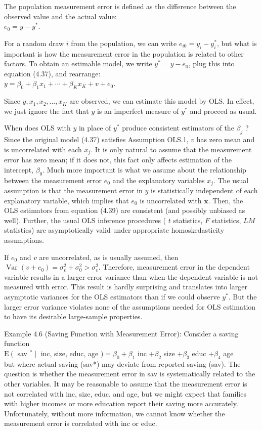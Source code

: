 \documentclass[10pt]{article}
\begin{document}
The population measurement error is defined as the difference between the observed value and the actual value:\\
$e_{0}=y-y^{*}$.

For a random draw $i$ from the population, we can write $e_{i 0}=y_{i}-y_{i}^{*}$, but what is important is how the measurement error in the population is related to other factors. To obtain an estimable model, we write $y^{*}=y-e_{0}$, plug this into equation (4.37), and rearrange:\\
$y=\beta_{0}+\beta_{1} x_{1}+\cdots+\beta_{K} x_{K}+v+e_{0}$.

Since $y, x_{1}, x_{2}, \ldots, x_{K}$ are observed, we can estimate this model by OLS. In effect, we just ignore the fact that $y$ is an imperfect measure of $y^{*}$ and proceed as usual.

When does OLS with $y$ in place of $y^{*}$ produce consistent estimators of the $\beta_{j}$ ? Since the original model (4.37) satisfies Assumption OLS.1, $v$ has zero mean and is uncorrelated with each $x_{j}$. It is only natural to assume that the measurement error has zero mean; if it does not, this fact only affects estimation of the intercept, $\beta_{0}$. Much more important is what we assume about the relationship between the measurement error $e_{0}$ and the explanatory variables $x_{j}$. The usual assumption is that the measurement error in $y$ is statistically independent of each explanatory variable, which implies that $e_{0}$ is uncorrelated with $\mathbf{x}$. Then, the OLS estimators from equation (4.39) are consistent (and possibly unbiased as well). Further, the usual OLS inference procedures ( $t$ statistics, $F$ statistics, $L M$ statistics) are asymptotically valid under appropriate homoskedasticity assumptions.

If $e_{0}$ and $v$ are uncorrelated, as is usually assumed, then $\operatorname{Var}\left(v+e_{0}\right)=\sigma_{v}^{2}+\sigma_{0}^{2}> \sigma_{v}^{2}$. Therefore, measurement error in the dependent variable results in a larger error variance than when the dependent variable is not measured with error. This result is hardly surprising and translates into larger asymptotic variances for the OLS estimators than if we could observe $y^{*}$. But the larger error variance violates none of the assumptions needed for OLS estimation to have its desirable large-sample properties.

Example 4.6 (Saving Function with Measurement Error): Consider a saving function\\
$\mathrm{E}\left(\right.$ sav $^{*} \mid$ inc, size, educ, age $)=\beta_{0}+\beta_{1}$ inc $+\beta_{2}$ size $+\beta_{3}$ educ $+\beta_{4}$ age\\
but where actual saving (sav*) may deviate from reported saving (sav). The question is whether the measurement error in sav is systematically related to the other variables. It may be reasonable to assume that the measurement error is not correlated with inc, size, educ, and age, but we might expect that families with higher incomes or more education report their saving more accurately. Unfortunately, without more information, we cannot know whether the measurement error is correlated with inc or educ.
\end{document}
